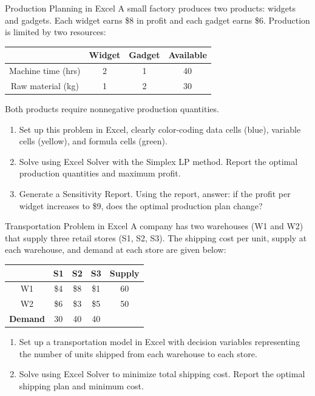 \begin{ex}{Production Planning in Excel}{}
\label{ex:excel-production-planning}
 A small factory produces two products: widgets and gadgets.  Each widget earns \$8 in profit and each gadget earns \$6.  Production is limited by two resources:

\begin{center}
\begin{tabular}{c|c|c|c}
 & \textbf{Widget} & \textbf{Gadget} & \textbf{Available} \\
\hline
Machine time (hrs) & 2 & 1 & 40 \\
Raw material (kg) & 1 & 2 & 30 \\
\end{tabular}
\end{center}

Both products require nonnegative production quantities.

\begin{enumerate}
\item Set up this problem in Excel, clearly color-coding data cells (blue), variable cells (yellow), and formula cells (green).
\item Solve using Excel Solver with the Simplex LP method. Report the optimal production quantities and maximum profit.
\item Generate a Sensitivity Report.  Using the report, answer: if the profit per widget increases to \$9, does the optimal production plan change?
\end{enumerate}
\exrefs{\S\ref{sec:excel-solver}}
\end{ex}

\begin{ex}{Transportation Problem in Excel}{}
\label{ex:excel-transportation}
 A company has two warehouses (W1 and W2) that supply three retail stores (S1, S2, S3). The shipping cost per unit, supply at each warehouse, and demand at each store are given below:

\begin{center}
\begin{tabular}{c|c|c|c|c}
 & S1 & S2 & S3 & \textbf{Supply} \\
\hline
W1 & \$4 & \$8 & \$1 & 60 \\
W2 & \$6 & \$3 & \$5 & 50 \\
\hline
\textbf{Demand} & 30 & 40 & 40 & \\
\end{tabular}
\end{center}

\begin{enumerate}
\item Set up a transportation model in Excel with decision variables representing the number of units shipped from each warehouse to each store.
\item Solve using Excel Solver to minimize total shipping cost. Report the optimal shipping plan and minimum cost.
\end{enumerate}
\exrefs{\S\ref{sec:excel-solver}, \S\ref{sec:transportation-problem}}
\end{ex}

